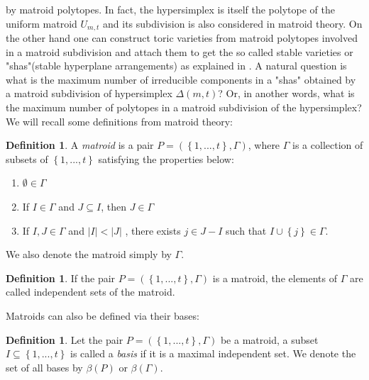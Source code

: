\documentclass[12pt, reqno]{amsart}
\theoremstyle{definition}
\newtheorem{definition}[theorem]{Definition}
\theoremstyle{remark}
\numberwithin{equation}{section}
\begin{document}
by matroid polytopes. In fact, the hypersimplex is itself the polytope of the uniform matroid $U_{m,t}$ and its subdivision is also considered in matroid theory\cite{oriented}.
On the other hand one can construct toric varieties from 
matroid polytopes
involved in a matroid subdivision and  attach them to get the so called stable varieties or "shas"(stable hyperplane arrangements) as explained in \cite{Alex}. A natural question is what is the maximum number of irreducible components in a "shas" obtained by a matroid subdivision of hypersimplex 
$\Delta(m,t)$?
Or, in another words, what 
is the maximum number of polytopes in a matroid subdivision of the hypersimplex? We will recall some definitions from matroid theory:

\begin{definition}
	A \emph{matroid} is a pair 
	$P=(\left\{1,...,t\right\},\varGamma)$,
	where 
	$\varGamma$
	is  a collection  
	of subsets of
	$\left\{1,...,t\right\}$
	satisfying the properties below:
	
	
	
	\begin{enumerate}
		\item 
		$ \emptyset \in \varGamma $
		\item 
		If $I\in \varGamma$ and $J\subseteq I$, then $J\in \varGamma$
		\item 
		If $I,J \in \varGamma$  and $|I| < |J|$ , there exists $j\in J-I$
		such that $I\cup  \left\{j\right\} \in  \varGamma $.
		
		
	\end{enumerate}
	
	We also denote the matroid simply by $\Gamma$.
	
\end{definition}



\begin{definition}
	If the  pair 
	$P=(\left\{1,...,t\right\},\varGamma)$ is a matroid, 
	the elements of $\varGamma$ are  called independent sets of the matroid.
	
\end{definition}


Matroids can also be defined via their bases:

\begin{definition}
	Let the  pair 
	$P=(\left\{1,...,t\right\},\varGamma)$ be a matroid, a subset 
	$I\subseteq \left\{1,...,t\right\}$ is called a \emph{basis} if it is a  
	maximal independent set. We denote the set of all bases by $\beta(P)$ or $\beta(\Gamma)$.
	
\end{definition}
\end{document}
